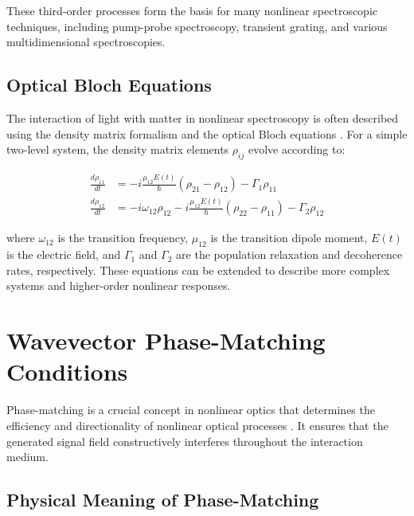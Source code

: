 \noindent These third-order processes form the basis for many nonlinear spectroscopic techniques, including pump-probe spectroscopy, transient grating, and various multidimensional spectroscopies.

\subsection{Optical Bloch Equations}
\label{subsec:optical_bloch}

\noindent The interaction of light with matter in nonlinear spectroscopy is often described using the density matrix formalism and the optical Bloch equations \cite{Tanimura1989}. For a simple two-level system, the density matrix elements $\rho_{ij}$ evolve according to:

\begin{align}
    \frac{d\rho_{11}}{dt} & = -i\frac{\mu_{12}E(t)}{\hbar}(\rho_{21} - \rho_{12}) - \Gamma_1 \rho_{11} \label{eq:bloch_population}                        \\
    \frac{d\rho_{12}}{dt} & = -i\omega_{12}\rho_{12} - i\frac{\mu_{12}E(t)}{\hbar}(\rho_{22} - \rho_{11}) - \Gamma_2 \rho_{12} \label{eq:bloch_coherence}
\end{align}

\noindent where $\omega_{12}$ is the transition frequency, $\mu_{12}$ is the transition dipole moment, $E(t)$ is the electric field, and $\Gamma_1$ and $\Gamma_2$ are the population relaxation and decoherence rates, respectively. These equations can be extended to describe more complex systems and higher-order nonlinear responses.


\section{Wavevector Phase-Matching Conditions}
\label{sec:phase_matching}

\noindent Phase-matching is a crucial concept in nonlinear optics that determines the efficiency and directionality of nonlinear optical processes \cite{Boyd2008, Scheurer2001}. It ensures that the generated signal field constructively interferes throughout the interaction medium.

\subsection{Physical Meaning of Phase-Matching}
\label{subsec:phase_matching_meaning}

